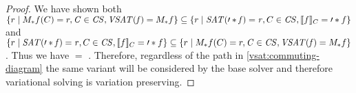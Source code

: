 \begin{proof}
  We have shown both \newline$\setc{r}{\submodel{f}{C} = r, \kf{C} \in \kf{CS},
    \kf{VSAT(f)} = \vmodel*{f}} \subseteq \setc{r}{\kf{SAT(\prime*{f}) = r}, C
    \in \kf{CS}, \sem[C]{f} = \prime*{f}}$ and \newline$\setc{r}{\kf{SAT(\prime*{f}) =
      r}, C \in \kf{CS}, \sem[C]{f} = \prime*{f}} \subseteq
  \setc{r}{\submodel{f}{C} = r, \kf{C} \in \kf{CS}, \kf{VSAT(f)} =
    \vmodel*{f}}$. Thus we have  $=$ \newline{}. Therefore, regardless of the path in
  \autoref{vsat:commuting-diagram} the same variant will be considered by the
  base solver and therefore variational solving is variation preserving.
\end{proof}


